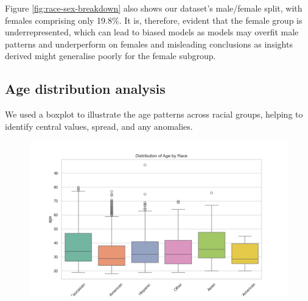 Figure \ref{fig:race-sex-breakdown} also shows our dataset's male/female split, with females comprising only 19.8\%. It is, therefore, evident that the female group is underrepresented, which can lead to biased models as models may overfit male patterns and underperform on females and misleading conclusions as insights derived might generalise poorly for the female subgroup.


\subsection{Age distribution analysis}


We used a boxplot to illustrate the age patterns across racial groups, helping to identify central values, spread, and any anomalies.

\begin{figure}[H]
	\centering
	\includegraphics[width=0.9	\linewidth]{img/age_by_race_boxplot}
	\caption{}
	\label{fig:age-by-race-boxplot}
\end{figure}



